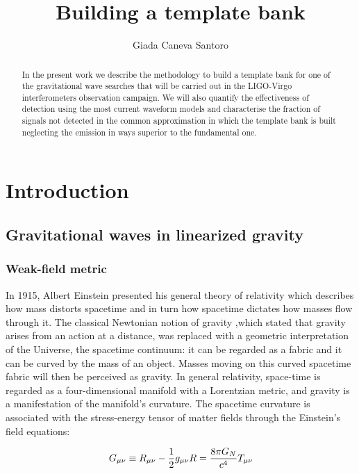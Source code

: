 \documentclass[binding=0.6cm, LaM]{sapthesis}
\title{Building a template bank}
\author{Giada Caneva Santoro}
\begin{document}
\frontmatter
\maketitle
\dedication{Dedicated to \\ me, whom I have been to hell and back.}

\begin{abstract}
In the present work we describe the methodology to build a template bank for one of the gravitational wave searches that will be carried out in the LIGO-Virgo interferometers observation campaign. We will also quantify the effectiveness of detection using the most current waveform models and characterise the fraction of signals not detected in the common approximation in which the template bank is built neglecting the emission in ways superior to the fundamental one.
\end{abstract}

\tableofcontents

\mainmatter 
\chapter{Introduction}
\section{Gravitational waves in linearized gravity}
\subsection{Weak-field metric}
In 1915, Albert Einstein presented his general theory of relativity  which describes how mass distorts spacetime and in turn how spacetime dictates how masses flow through it. The classical Newtonian notion of gravity ,which stated that gravity arises from an action at a distance, was replaced with a geometric interpretation of the Universe, the spacetime continuum: it can be regarded as a fabric and it can be curved by the mass of an object. Masses moving on this curved spacetime fabric will then be perceived as gravity. 
In general relativity, space-time is regarded as a four-dimensional manifold with a Lorentzian metric, and gravity is a manifestation of the manifold’s curvature. The spacetime curvature is associated with the stress-energy tensor of matter fields through the Einstein’s field equations:

\begin{equation}
G_{\mu\nu} \equiv R_{\mu\nu}  - {1 \over 2}g_{\mu\nu}R = {8\pi G_{N} \over {c^4}}T_{\mu\nu} 
\end{equation}
\end{document}
